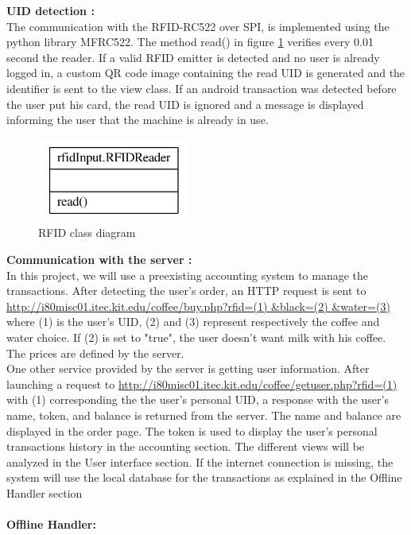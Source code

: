 \documentclass[12pt]{article}
\begin{document}
   
   \textbf{UID detection :} \\
   
   The communication with the RFID-RC522 over SPI, is implemented using the python library MFRC522. The method read() in figure \ref{fig:rfidclass} verifies every 0.01 second the reader. 
   If a valid RFID emitter is detected and no user is already logged in, a custom QR code image containing the read UID is generated and the identifier is sent to the view class.
   If an android transaction was detected before the user put his card, the read UID is ignored and a message is displayed informing the user that the machine is already in use.\\
   
   \begin{figure}[h]
   \centering
   \includegraphics[width=5cm]{./images/rfidReaderClasses}
   \captionsetup{justification=centering}
   \caption{RFID class diagram}
   \label{fig:rfidclass}
  \end{figure}
  \textbf{Communication with the server :} \\
   
   In this project, we will use a preexisting accounting system to manage the transactions. After detecting the user's order, an HTTP request is sent to 
   \url{http://i80misc01.itec.kit.edu/coffee/buy.php?rfid=(1) &black=(2) &water=(3)}\\
   where (1) is the user's UID, (2) and (3) represent respectively the coffee and water choice. 
   If (2) is set to "true", the user doesn't want milk with his coffee.
   The prices are defined by the server.\\
   
   One other service provided by the server is getting user information. After launching a request to \url{http://i80misc01.itec.kit.edu/coffee/getuser.php?rfid=(1)}
   with (1) corresponding the the user's personal UID, a response with the user's name, token, and balance is returned from the server. The name and balance are displayed in the order page. 
   The token is used to display the user's personal transactions history in the accounting section. The different views will be analyzed in the User interface section.
   If the internet connection is missing, the system will use the local database for the transactions as explained in the Offline Handler section\\~\\
   \textbf{Offline Handler:}\\
   
\end{document}
